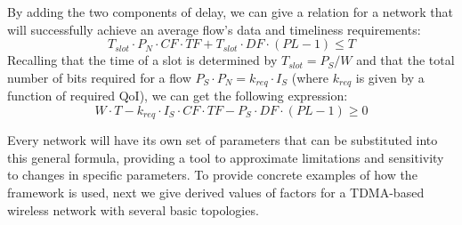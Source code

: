 By adding the two components of delay, we can give a relation for a network that will successfully achieve an average flow's data and timeliness requirements:
\begin{equation*}
	T_{slot} \cdot P_N \cdot CF \cdot TF + T_{slot} \cdot DF \cdot (PL-1) \leq T
\end{equation*}
Recalling that the time of a slot is determined by %
$T_{slot} = P_S/W$ %
and that the total number of bits required for a flow $P_S \cdot P_N =  k_{req} \cdot I_S$ (where $k_{req}$ is given by a function of required QoI), we can get the following expression:
\begin{equation}
	W \cdot T - k_{req} \cdot I_S \cdot CF \cdot TF - P_S \cdot DF \cdot (PL-1) \geq 0	
	\label{eq:general_scal}
\end{equation}

Every network will have its own set of parameters that can be substituted into this general formula, providing a tool to approximate limitations and sensitivity to changes in specific parameters. To provide concrete examples of how the framework is used, next we give derived values of factors for a TDMA-based wireless network with several basic topologies.




